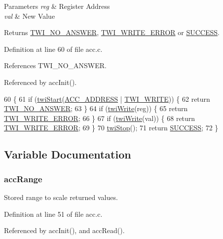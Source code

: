 \begin{DoxyParams}{Parameters}
{\em reg} & Register Address \\
\hline
{\em val} & New Value \\
\hline
\end{DoxyParams}
\begin{DoxyReturn}{Returns}
\hyperlink{group__error_gga2c3e4bb40f36b262a5214e2da2bca9c5a04d5943ba652af2205c88b247e0c659c}{T\-W\-I\-\_\-\-N\-O\-\_\-\-A\-N\-S\-W\-E\-R}, \hyperlink{group__error_gga2c3e4bb40f36b262a5214e2da2bca9c5ac0e3b3463dcaf220e54794b4711708c9}{T\-W\-I\-\_\-\-W\-R\-I\-T\-E\-\_\-\-E\-R\-R\-O\-R} or \hyperlink{group__error_gga2c3e4bb40f36b262a5214e2da2bca9c5ac7f69f7c9e5aea9b8f54cf02870e2bf8}{S\-U\-C\-C\-E\-S\-S}. 
\end{DoxyReturn}


Definition at line 60 of file acc.\-c.



References T\-W\-I\-\_\-\-N\-O\-\_\-\-A\-N\-S\-W\-E\-R.



Referenced by acc\-Init().


\begin{DoxyCode}
60                                                  \{
61     \textcolor{keywordflow}{if} (\hyperlink{group__twi_ga4f86edc73f37ce976ea2225519ab31cd}{twiStart}(\hyperlink{group__acc_ga27341a8e1cb1a6ace5a5cf3caea1c99f}{ACC\_ADDRESS} | \hyperlink{group__twi_ga3b68e8e777b71520f9dbfac733774d5f}{TWI\_WRITE})) \{
62         \textcolor{keywordflow}{return} \hyperlink{group__error_gga2c3e4bb40f36b262a5214e2da2bca9c5a04d5943ba652af2205c88b247e0c659c}{TWI\_NO\_ANSWER};
63     \}
64     \textcolor{keywordflow}{if} (\hyperlink{group__twi_gaf42e50aaf4a9794d3a2c000e7b407887}{twiWrite}(reg)) \{
65         \textcolor{keywordflow}{return} \hyperlink{group__error_gga2c3e4bb40f36b262a5214e2da2bca9c5ac0e3b3463dcaf220e54794b4711708c9}{TWI\_WRITE\_ERROR};
66     \}
67     \textcolor{keywordflow}{if} (\hyperlink{group__twi_gaf42e50aaf4a9794d3a2c000e7b407887}{twiWrite}(val)) \{
68         \textcolor{keywordflow}{return} \hyperlink{group__error_gga2c3e4bb40f36b262a5214e2da2bca9c5ac0e3b3463dcaf220e54794b4711708c9}{TWI\_WRITE\_ERROR};
69     \}
70     \hyperlink{group__twi_gabf581270e9537a60e2d8cf3d2c1543d1}{twiStop}();
71     \textcolor{keywordflow}{return} \hyperlink{group__error_gga2c3e4bb40f36b262a5214e2da2bca9c5ac7f69f7c9e5aea9b8f54cf02870e2bf8}{SUCCESS};
72 \}
\end{DoxyCode}


\subsection{Variable Documentation}
\hypertarget{group__acc_ga450bb9262f697cdcab7185674b9fc6a3}{
\subsubsection[{acc\-Range}]{ acc\-Range}}\label{group__acc_ga450bb9262f697cdcab7185674b9fc6a3}


Stored range to scale returned values. 



Definition at line 51 of file acc.\-c.



Referenced by acc\-Init(), and acc\-Read().

